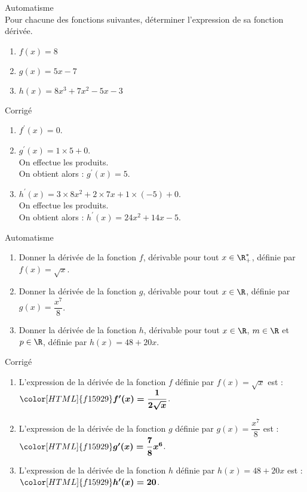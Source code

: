\documentclass[a4paper,11pt,exos]{nsi} %
\newcounter{autNum}
\newcommand{\aut}[1]
{
	\addtocounter{autNum}{1}
	{\titlefont\color{UGLiBlue}\Large Automatisme\ \theautNum\ \normalsize{#1}}\smallskip	
}
\newcounter{corNum}
\newcommand{\cor}[1]
{
	\addtocounter{corNum}{1}
	{\titlefont\color{UGLiOrange}\Large Corrigé\ \thecorNum\ \normalsize{#1}}\smallskip	
}
\begin{document}
\maketitle

\begin{multicols}{2}
\aut{}\\%
Pour chacune des fonctions suivantes, déterminer l'expression de sa fonction dérivée.

\begin{enumerate}[]
	\item $f(x)=8$
	\item $g(x)=5x-7$
	\item $h(x)=8x^3+7x^2-5x-3$
\end{enumerate}
\vfill\null\columnbreak

\cor{}
\begin{enumerate}[]
    \item $f^\prime(x)= 0$.
    \item $g^\prime(x)=1\times 5+0$.\\On effectue les produits.\\On obtient alors : $g^\prime(x)=5$.
    \item $h^\prime(x)=3\times 8x^{2}+2\times 7x+1\times (-5)+0$.\\On effectue les produits.\\On obtient alors : $h^\prime(x)=24x^{2}+14x-5$.
    \end{enumerate}

\end{multicols}

	\aut{}%
	\begin{enumerate}[]
		\item Donner la dérivée de la fonction $f$, dérivable pour tout $x\in\R^*_+$, définie par  $f(x)=\sqrt{x}$.
		\item Donner la dérivée de la fonction $g$, dérivable pour tout $x\in\R$, définie par  $g(x)=\dfrac{x^{7}}{8}$.
		\item Donner la dérivée de la fonction $h$, dérivable pour tout $x\in\R$, $m\in\R$ et $p\in\R$, définie par  $h(x)=48+20x$.
	\end{enumerate}

	\cor{}
	\begin{enumerate}[]
		\item L'expression de la dérivée de la fonction $f$ définie par $f(x)=\sqrt{x}$ est : ${\color[HTML]{f15929}\boldsymbol{f'(x)=\dfrac{1}{2\sqrt{x}}}}$.
		\item L'expression de la dérivée de la fonction $g$ définie par $g(x)=\dfrac{x^{7}}{8}$ est : ${\color[HTML]{f15929}\boldsymbol{g'(x)=\dfrac{7}{8}x^{6}}}$.
		\item L'expression de la dérivée de la fonction $h$ définie par $h(x)=48+20x$ est : ${\color[HTML]{f15929}\boldsymbol{h'(x)=20}}$.
		\end{enumerate}
\end{document}
